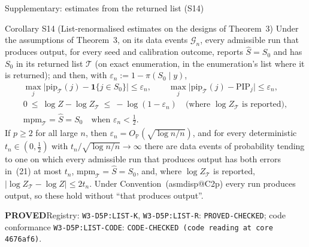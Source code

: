 \documentclass[aspectratio=169]{beamer}
\makeatletter
\newcommand{\asmdisp}[1]{\csname asmdisp@#1\endcsname}
\newcommand{\as}[1]{\textup{(\asmdisp{#1})}}
\newcommand{\ind}[1]{\mathbf{1}\{#1\}}
\newcommand{\abs}[1]{\lvert #1\rvert}
\renewcommand{\P}{\mathbb{P}}
\newcommand{\OP}{O_{\P}}
\newcommand{\Sz}{S_0}
\newcommand{\rn}{\sqrt{\log n/n}}
\newcommand{\pis}[1]{\pi(#1\mid y)}
\newcommand{\PIP}{\mathrm{PIP}}
\newcommand{\Shat}{\hat S}
\newcommand{\rid}[1]{\texttt{#1}}
\makeatother
\begin{document}
\begin{frame}{Supplementary: estimates from the returned list (S14)}
\footnotesize
\begin{block}{Corollary S14 (List-renormalised estimates on the designs of Theorem~3)}
Under the assumptions of Theorem~3, on its data events $\mathcal G_n$, every admissible run that produces
output, for every seed and calibration outcome, reports $\Shat=\Sz$ and has $\Sz$ in its returned list $\mathcal T$ (on
exact enumeration, in the enumeration's list where it is returned); and then, with $\varepsilon_n:=1-\pis{\Sz}$,
\begin{gather}
  \max_j\big|\mathrm{pip}_{\mathcal T}(j)-\ind{j\in\Sz}\big|\le\varepsilon_n,\qquad
  \max_j\big|\mathrm{pip}_{\mathcal T}(j)-\PIP_j\big|\le\varepsilon_n,\tag{21}\\
  0\ \le\ \log Z-\log Z_{\mathcal T}\ \le\ -\log(1-\varepsilon_n)\quad\text{(where $\log Z_{\mathcal T}$ is reported)},\tag{22}\\
  \mathrm{mpm}_{\mathcal T}=\Shat=\Sz\quad\text{when }\varepsilon_n<\tfrac12 .\tag{23}
\end{gather}
If $p\ge2$ for all large $n$, then $\varepsilon_n=\OP(\rn)$, and for every deterministic $t_n\in(0,\tfrac12)$ with
$t_n/\rn\to\infty$ there are data events of probability tending to one on which every admissible run that produces output
has both errors in~\textup{(21)} at most $t_n$, $\mathrm{mpm}_{\mathcal T}=\Shat=\Sz$, and, where $\log Z_{\mathcal T}$ is
reported, $\abs{\log Z_{\mathcal T}-\log Z}\le2t_n$. Under Convention~\as{C2p} every run produces output, so these hold
without ``that produces output''.
\end{block}
{\footnotesize \textbf{PROVED}\quad Registry: \rid{W3-D5P:LIST-K}, \rid{W3-D5P:LIST-R}: \rid{PROVED-CHECKED}; code conformance \rid{W3-D5P:LIST-CODE}:
\rid{CODE-CHECKED (code reading at core 4676af6)}.}

\end{frame}
\end{document}
